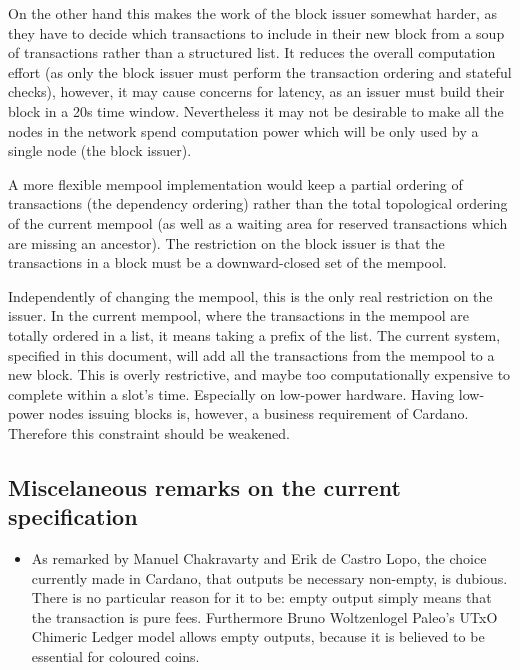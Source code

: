 \documentclass{article}
\begin{document}
On the other hand this makes the work of the block issuer somewhat harder,
as they have to decide which transactions to include in their new
block from a soup of transactions rather than a structured list. It
reduces the overall computation effort (as only the block issuer must
perform the transaction ordering and stateful checks), however, it may
cause concerns for latency, as an issuer must build their block in a
20s time window. Nevertheless it may not be desirable to make all the
nodes in the network spend computation power which will be only used
by a single node (the block issuer).

A more flexible mempool implementation would keep a partial ordering
of transactions (the dependency ordering) rather than the total
topological ordering of the current mempool (as well as a waiting area
for reserved transactions which are missing an ancestor). The
restriction on the block issuer is that the transactions in a block
must be a downward-closed set of the mempool.

Independently of changing the mempool, this is the only real
restriction on the issuer. In the current mempool, where the
transactions in the mempool are totally ordered in a list, it means
taking a prefix of the list. The current system, specified in this
document, will add all the transactions from the mempool to a new
block. This is overly restrictive, and maybe too computationally
expensive to complete within a slot's time. Especially on low-power
hardware. Having low-power nodes issuing blocks is, however, a business
requirement of Cardano. Therefore this constraint should be weakened.

\subsection{Miscelaneous remarks on the current specification}
\label{sec:misc-remarks}
\begin{itemize}
\item As remarked by Manuel Chakravarty and Erik de Castro Lopo, the
  choice currently made in Cardano, that outputs be necessary
  non-empty, is dubious. There is no particular reason for it to be:
  empty output simply means that the transaction is pure
  fees. Furthermore Bruno Woltzenlogel Paleo's UTxO Chimeric Ledger
  model allows empty outputs, because it is believed to be essential
  for coloured coins.
\end{itemize}
\end{document}
